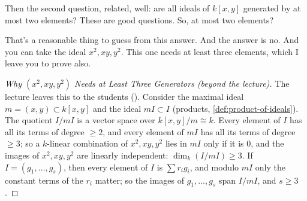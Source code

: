 \begin{speech}[00:01:19 - 00:02:03]
Then the second question, related, well: are all ideals  of $k[x, y]$  generated by at most two elements?  These are good questions.  So, at most two elements?

That's a reasonable thing to guess from this answer. And the answer is no.  And you can take the ideal  $x^2, xy, y^2$. This one needs at least three elements, which I leave you to prove also.
\end{speech}

\begin{content}


\begin{proof}[Why $(x^2, xy, y^2)$ Needs at Least Three Generators (beyond the lecture)]
The lecture leaves this to the students (). Consider the maximal ideal $m = (x, y) \subset k[x, y]$ and the ideal $m I \subset I$ (products, \cref{def:product-of-ideals}). The quotient $I / m I$ is a vector space over $k[x, y]/m \cong k$. Every element of $I$ has all its terms of degree $\ge 2$, and every element of $m I$ has all its terms of degree $\ge 3$; so a $k$-linear combination of $x^2, xy, y^2$ lies in $m I$ only if it is $0$, and the images of $x^2, xy, y^2$ are linearly independent: $\dim_k(I / m I) \ge 3$. If $I = (g_1, \dots, g_s)$, then every element of $I$ is $\sum r_i g_i$, and modulo $m I$ only the constant terms of the $r_i$ matter; so the images of $g_1, \dots, g_s$ span $I / m I$, and $s \ge 3$.
\end{proof}
\end{content}

